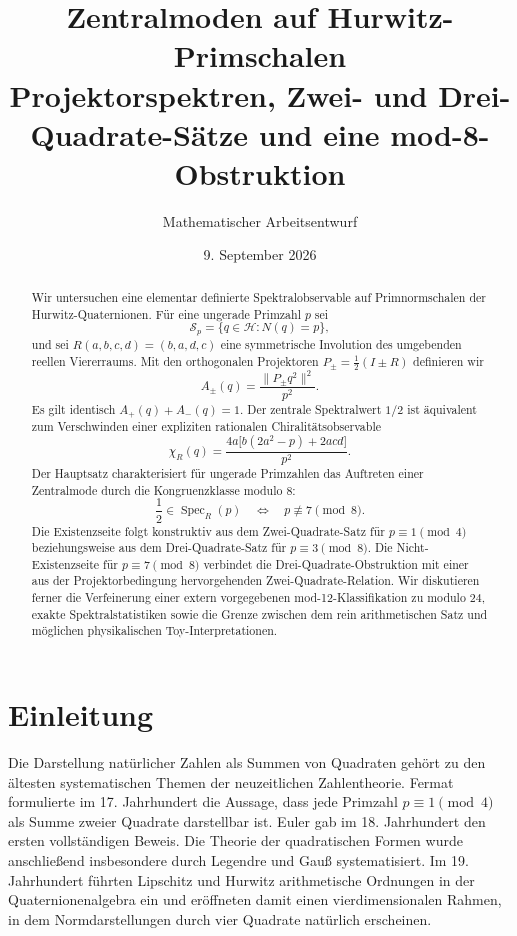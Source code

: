 \documentclass[11pt,a4paper]{article}
\title{\textbf{Zentralmoden auf Hurwitz-Primschalen}\\[3mm]
\large Projektorspektren, Zwei- und Drei-Quadrate-Sätze und eine mod-8-Obstruktion}
\author{Mathematischer Arbeitsentwurf}
\date{9. September 2026}
\theoremstyle{definition}
\newcommand{\Spec}{\operatorname{Spec}}
\begin{document}
\maketitle

\begin{abstract}
Wir untersuchen eine elementar definierte Spektralobservable auf Primnormschalen der Hurwitz-Quaternionen. Für eine ungerade Primzahl $p$ sei
\[
\mathcal S_p=\{q\in\mathcal H:N(q)=p\},
\]
und sei $R(a,b,c,d)=(b,a,d,c)$ eine symmetrische Involution des umgebenden reellen Viererraums. Mit den orthogonalen Projektoren $P_\pm=\frac12(I\pm R)$ definieren wir
\[
A_\pm(q)=\frac{\|P_\pm q^2\|^2}{p^2}.
\]
Es gilt identisch $A_+(q)+A_-(q)=1$. Der zentrale Spektralwert $1/2$ ist äquivalent zum Verschwinden einer expliziten rationalen Chiralitätsobservable
\[
\chi_R(q)=\frac{4a\bigl[b(2a^2-p)+2acd\bigr]}{p^2}.
\]
Der Hauptsatz charakterisiert für ungerade Primzahlen das Auftreten einer Zentralmode durch die Kongruenzklasse modulo $8$:
\[
\frac12\in\Spec_R(p)\quad\Longleftrightarrow\quad p\not\equiv7\pmod8.
\]
Die Existenzseite folgt konstruktiv aus dem Zwei-Quadrate-Satz für $p\equiv1\pmod4$ beziehungsweise aus dem Drei-Quadrate-Satz für $p\equiv3\pmod8$. Die Nicht-Existenzseite für $p\equiv7\pmod8$ verbindet die Drei-Quadrate-Obstruktion mit einer aus der Projektorbedingung hervorgehenden Zwei-Quadrate-Relation. Wir diskutieren ferner die Verfeinerung einer extern vorgegebenen mod-12-Klassifikation zu modulo $24$, exakte Spektralstatistiken sowie die Grenze zwischen dem rein arithmetischen Satz und möglichen physikalischen Toy-Interpretationen.
\end{abstract}

\tableofcontents
\newpage

\section{Einleitung}
Die Darstellung natürlicher Zahlen als Summen von Quadraten gehört zu den ältesten systematischen Themen der neuzeitlichen Zahlentheorie. Fermat formulierte im 17. Jahrhundert die Aussage, dass jede Primzahl $p\equiv1\pmod4$ als Summe zweier Quadrate darstellbar ist. Euler gab im 18. Jahrhundert den ersten vollständigen Beweis. Die Theorie der quadratischen Formen wurde anschließend insbesondere durch Legendre und Gauß systematisiert. Im 19. Jahrhundert führten Lipschitz und Hurwitz arithmetische Ordnungen in der Quaternionenalgebra ein und eröffneten damit einen vierdimensionalen Rahmen, in dem Normdarstellungen durch vier Quadrate natürlich erscheinen.
\end{document}
